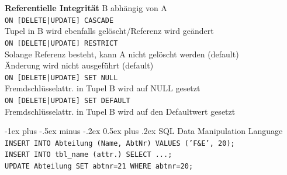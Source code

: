 \documentclass[10pt,landscape,a4paper]{article}
\makeatletter
\renewcommand{\section}{\@startsection{section}{1}{0mm}%
                                {-1ex plus -.5ex minus -.2ex}%
                                {0.5ex plus .2ex}%
                                {\normalfont\large\bfseries}}
\newcommand{\sql}[1]{\texttt{#1}}
\makeatother
\begin{document}
\begin{multicols*}{3}
\begin{verbatim}
\end{verbatim}
\textbf{Referentielle Integrität} B abhängig von A\\
\texttt{ON [DELETE|UPDATE] CASCADE}\\
Tupel in B wird ebenfalls gelöscht/Referenz wird geändert\\
\texttt{ON [DELETE|UPDATE] RESTRICT}\\
Solange Referenz besteht, kann A nicht gelöscht werden (default)\\
Änderung wird nicht ausgeführt (default)\\
\texttt{ON [DELETE|UPDATE] SET NULL}\\
Fremdschlüsselattr. in Tupel B wird auf NULL gesetzt\\
\texttt{ON [DELETE|UPDATE] SET DEFAULT}\\
Fremdschlüsselattr. in Tupel B wird auf den Defaultwert gesetzt

\section{SQL Data Manipulation Language}
\texttt{INSERT INTO Abteilung (Name, AbtNr) VALUES ('F&E', 20);}\\
\sql{INSERT INTO tbl_name (attr.) SELECT ...;}\\
\texttt{UPDATE Abteilung SET abtnr=21 WHERE abtnr=20;}


\end{multicols*}
\end{document}
